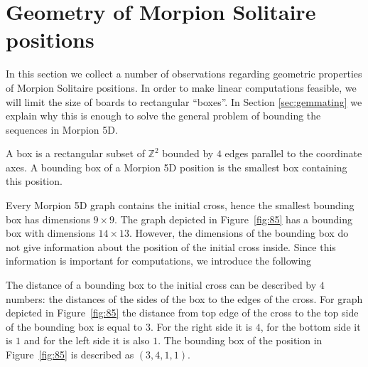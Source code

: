 \section{Geometry of Morpion Solitaire positions}
\label{sec:geometry}

In this section we collect a number of observations regarding geometric properties of Morpion Solitaire positions. 
In order to make linear computations feasible, we will limit the size of boards to rectangular ``boxes''.  In Section \ref{sec:gemmating} we explain why this is enough to solve the general problem of bounding the sequences in Morpion 5D. 
\begin{definition}
A box is a rectangular subset of ${\mathbb Z}^2$ bounded by $4$ edges parallel to the coordinate axes. A bounding box of a Morpion 5D position is the smallest box
containing this position. %
\end{definition}

Every Morpion 5D graph contains the initial cross, hence the smallest bounding box has dimensions $9 \times 9$.
The graph depicted in Figure~\ref{fig:85} has a bounding box with dimensions $14 \times 13$.
However, the dimensions of the bounding box do not give information about the position of the initial cross inside. Since
this information is important for computations, we introduce the following %

\begin{notation*}
The distance of a bounding box to the initial cross can be described by $4$ numbers: the distances of the sides of the box to the edges of the cross. 
For graph depicted in Figure~\ref{fig:85} the distance from top edge of the cross to the top side of the bounding box is equal to $3$. For the right side it is $4$, for the bottom side it is $1$ and for the left side it is also $1$. 
The bounding box of the position in Figure~\ref{fig:85} is described as $(3,4,1,1)$.
\end{notation*}
  
